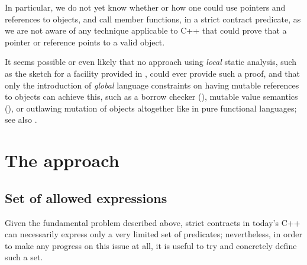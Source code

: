 In particular, we do not yet know whether or how one could use pointers and references to objects, and call member functions, in a strict contract predicate, as we are not aware of any technique applicable to C++ that could prove that a pointer or reference points to a valid object.

It seems possible or even likely that no approach using \emph{local} static analysis, such as the sketch for a  \mbox{} facility provided in \cite{P3285R0}, could ever provide such a proof, and that only the introduction of \emph{global} language constraints on having mutable references to objects can achieve this, such as a borrow checker (\cite{P3390R0}), mutable value semantics (\cite{Racordon2022}), or outlawing mutation of objects altogether like in pure functional languages; see also \cite{Baxter2024}.

\section{The approach}

\subsection{Set of allowed expressions}

Given the fundamental problem described above, strict contracts in today's C++ can necessarily express only a very limited set of predicates; nevertheless, in order to make any progress on this issue at all, it is useful to try and concretely define such a set.


